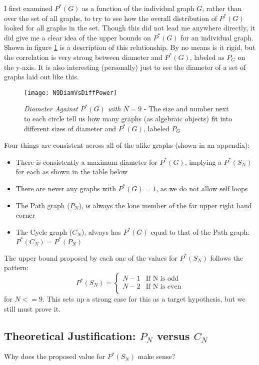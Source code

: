 I first examined $P^*(G)$ as a function of the individual graph $G$, rather than over the set of all graphs, to try to see how the overall distribution of $P^*(G)$ looked for all graphs in the set.
Though this did not lead me anywhere directly, it did give me a clear idea of the upper bounds on $P^*(G)$ for an individual graph.
Shown in figure \ref{fig:diamvsmaxpower} is a description of this relationship.  By no means is it rigid, but the correlation is very strong between diameter and $P^*(G)$, labeled as $P_G$ on the y-axis.
It is also interesting (personally) just to see the diameter of a set of graphs laid out like this.

\begin{figure}[h]
\label{fig:diamvsmaxpower}
\caption{\emph{Diameter Against $P^*(G)$ with $N=9$} - The size and number next to each circle tell us how many graphs (as algebraic objects) fit into different sizes of diameter and $P^*(G)$, labeled $P_G$}
\centering
\texttt{[image: N9DiamVsDiffPower]}
\end{figure}

Four things are consistent across all of the alike graphs (shown in an appendix):
\begin{itemize}
\item{There is consistently a maximum diameter for $P^*(G)$, implying a $P^*(S_N)$ for each as shown in the table below}
\item{There are never any graphs with $P^*(G) = 1$, as we do not allow self loops }
\item{The Path graph ($P_N$), is always the lone member of the far upper right hand corner}
\item{The Cycle graph ($C_N$), always has $P^*(G)$ equal to that of the Path graph: $P^*(C_N) = P^*(P_N)$}
\end{itemize}
The upper bound proposed by each one of the values for $P^*(S_N)$ follows the pattern:
\[ P^*(S_N) = \begin{cases} 
      N-1 & \text{If N is odd} \\
      N-2 & \text{If N is even} \\
   \end{cases}
\]
for $N <=9$. This sets up a strong case for this as a target hypothesis, but we still must prove it.

\subsection{Theoretical Justification: $P_N$ versus $C_N$}
Why does the proposed value for $P^*(S_N)$ make sense?

